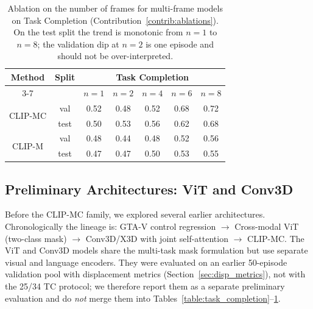 \begin{table}[ht]
\begin{center}
\begin{tabular}{|c|c|ccccc|}
\hline
\multirow{2}{*}{Method} & \multirow{2}{*}{Split} & \multicolumn{5}{c|}{Task Completion} \\ \cline{3-7}
 & & \multicolumn{1}{c|}{$n=1$} & \multicolumn{1}{c|}{$n=2$} & \multicolumn{1}{c|}{$n=4$} & \multicolumn{1}{c|}{$n=6$} & $n=8$ \\ \hline
\multirow{2}{*}{CLIP-MC} & val & \multicolumn{1}{c|}{0.52} & \multicolumn{1}{c|}{0.48} & \multicolumn{1}{c|}{0.52} & \multicolumn{1}{c|}{0.68} & 0.72 \\ \cline{2-7}
 & test & \multicolumn{1}{c|}{0.50} & \multicolumn{1}{c|}{0.53} & \multicolumn{1}{c|}{0.56} & \multicolumn{1}{c|}{0.62} & 0.68 \\ \hline
\multirow{2}{*}{CLIP-M} & val & \multicolumn{1}{c|}{0.48} & \multicolumn{1}{c|}{0.44} & \multicolumn{1}{c|}{0.48} & \multicolumn{1}{c|}{0.52} & 0.56 \\ \cline{2-7}
 & test & \multicolumn{1}{c|}{0.47} & \multicolumn{1}{c|}{0.47} & \multicolumn{1}{c|}{0.50} & \multicolumn{1}{c|}{0.53} & 0.55 \\ \hline
\end{tabular}
\end{center}
\caption[Frame-count ablation on Task Completion]{Ablation on the number of frames for multi-frame models on Task Completion (Contribution~\ref{contrib:ablations}). On the test split the trend is monotonic from $n=1$ to $n=8$; the validation dip at $n=2$ is one episode and should not be over-interpreted.}
\label{table:frame_ablation}
\end{table}

\subsection{Preliminary Architectures: ViT and Conv3D}
\label{sec:prelim_arch}

Before the CLIP-MC family, we explored several earlier architectures. Chronologically the lineage is: GTA-V control regression $\rightarrow$ Cross-modal ViT (two-class mask) $\rightarrow$ Conv3D/X3D with joint self-attention $\rightarrow$ CLIP-MC. The ViT and Conv3D models share the multi-task mask formulation but use separate visual and language encoders. They were evaluated on an earlier 50-episode validation pool with displacement metrics (Section~\ref{sec:disp_metrics}), not with the 25/34 TC protocol; we therefore report them as a separate preliminary evaluation and do \emph{not} merge them into Tables~\ref{table:task_completion}--\ref{table:frame_ablation}.

